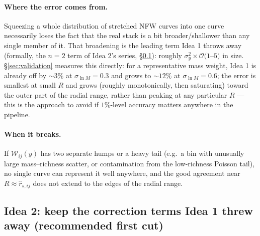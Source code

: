 \documentclass[a4paper, 11pt]{article}
\newcommand{\lnM}{\ln M}
\newcommand{\reffi}[1]{\hat r_{s,#1}}
\newcommand{\Wcal}{\mathcal{W}}
\begin{document}
\paragraph{Where the error comes from.} Squeezing a whole
distribution of stretched NFW curves into one curve necessarily
loses the fact that the real stack is a bit broader/shallower than
any single member of it. That broadening is the leading term Idea
1 throws away (formally, the $n=2$ term of Idea 2's series,
\S\ref{sec:approach2}): roughly $\sigma_y^2\times\mathcal{O}(1$--$5)$
in size. \S\ref{sec:validation} measures this directly: for a
representative mass weight, Idea 1 is already off by
$\sim3\%$ at $\sigma_{\lnM}=0.3$ and grows to $\sim12\%$ at
$\sigma_{\lnM}=0.6$; the error is smallest at small $R$ and grows
(roughly monotonically, then saturating) toward the outer part of
the radial range, rather than peaking at any particular $R$ ---
this is the approach to avoid if $1\%$-level accuracy matters
anywhere in the pipeline.

\paragraph{When it breaks.} If $\Wcal_{ij}(y)$ has two separate
humps or a heavy tail (e.g.\ a bin with unusually large
mass--richness scatter, or contamination from the low-richness
Poisson tail), no single curve can represent it well anywhere, and
the good agreement near $R\approx\reffi{ij}$ does not extend to
the edges of the radial range.

\subsection{Idea 2: keep the correction terms Idea 1 threw away (recommended first cut)}
\label{sec:approach2}
\end{document}
